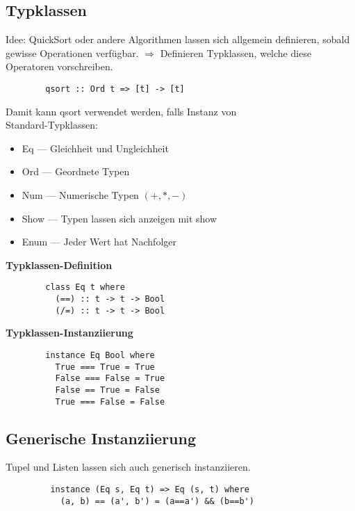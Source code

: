         \subsection{Typklassen}
        Idee: QuickSort oder andere Algorithmen lassen sich allgemein definieren, sobald gewisse Operationen verfügbar.
        \(\Rightarrow\) Definieren Typklassen, welche diese Operatoren vorschreiben.
        \begin{lstlisting}
        qsort :: Ord t => [t] -> [t]
       \end{lstlisting}
        Damit kann qsort verwendet werden, falls  Instanz von \\
        Standard-Typklassen:
        \begin{itemize}
          \item Eq --- Gleichheit und Ungleichheit
          \item Ord --- Geordnete Typen
          \item Num --- Numerische Typen \((+,*,-)\)
          \item Show --- Typen lassen sich anzeigen mit show
          \item Enum --- Jeder Wert hat Nachfolger
        \end{itemize}
        \textbf{Typklassen-Definition}
        \begin{lstlisting}
        class Eq t where
          (==) :: t -> t -> Bool
          (/=) :: t -> t -> Bool
       \end{lstlisting}
        \textbf{Typklassen-Instanziierung}
        \begin{lstlisting}
        instance Eq Bool where
          True === True = True
          False === False = True
          False == True = False
          True === False = False
      \end{lstlisting}
        

        \subsection{Generische Instanziierung}
        Tupel und Listen lassen sich auch generisch instanziieren.
        \begin{lstlisting}
         instance (Eq s, Eq t) => Eq (s, t) where
           (a, b) == (a', b') = (a==a') && (b==b')
       \end{lstlisting}
        
